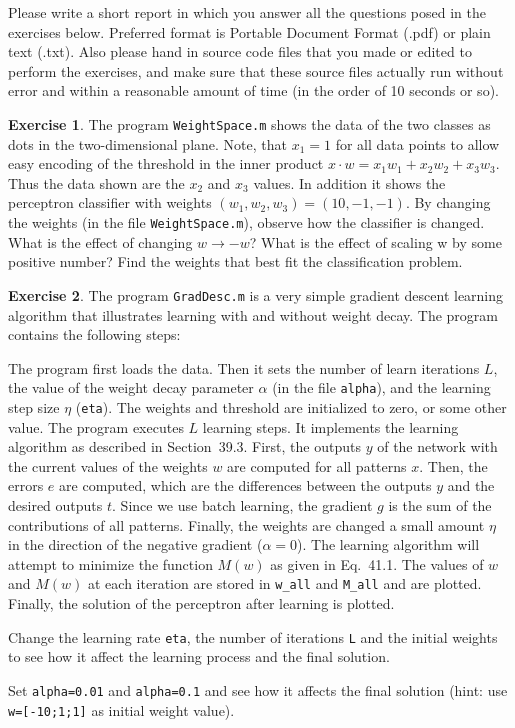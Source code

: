 \documentclass[a4paper]{article}
\theoremstyle{definition}
\newtheorem{ex}{Exercise}
\begin{document}
Please write a short report in which you answer all the questions posed in the exercises below. Preferred format is Portable Document Format (.pdf) or plain text (.txt). Also please hand in source code files that you made or edited to perform the exercises, and make sure that these source files actually run without error and within a reasonable amount of time (in the order of 10 seconds or so). 

\begin{ex}

The program \texttt{WeightSpace.m} shows the data of the two classes as dots in the two-dimensional plane. Note, that $x_1=1$ for all data points to allow easy encoding of the threshold in the inner product $x\cdot w = x_1w_1+x_2w_2+x_3w_3$. Thus the data shown are the $x_2$ and $x_3$ values. In addition it shows the perceptron classifier with weights $(w_1,w_2,w_3)=(10, -1, -1)$. By changing the weights (in the file \texttt{WeightSpace.m}), observe how the classifier is changed. What is the effect of changing $w \rightarrow -w$? What is the effect of scaling w by some positive number? Find the weights that best fit the classification problem. 

\end{ex}
\begin{ex}


The program \texttt{GradDesc.m} is a very simple gradient descent learning
algorithm that illustrates learning with and without weight decay. The
program contains the following steps:

The program first loads the data. Then it sets the number of learn iterations $L$, the value of the weight decay parameter $\alpha$ (in the file \texttt{alpha}), and the learning step size $\eta$ (\texttt{eta}). The weights and threshold are initialized to zero, or some other value. The program executes $L$ learning steps. It implements the learning algorithm as described in Section~39.3. First, the outputs $y$ of the network with the current values of the weights $w$ are computed for all patterns $x$. Then, the errors $e$ are computed, which are the differences between the outputs $y$ and the desired outputs $t$. Since we use batch learning, the gradient $g$ is the sum of the contributions of all patterns. Finally, the weights are changed a small amount $\eta$ in the direction of the negative gradient ($\alpha=0$). The learning algorithm will attempt to minimize the function $M(w)$ as given in Eq.~41.1. The values of $w$ and $M(w)$ at each iteration are stored in \texttt{w\_all} and
\texttt{M\_all} and are plotted. Finally, the solution of the perceptron after learning is plotted.

Change the learning rate \texttt{eta}, the number of iterations \texttt{L} and the initial weights to see how it affect the learning process and the final solution.

Set \texttt{alpha=0.01} and \texttt{alpha=0.1} and see how it affects the final solution (hint: use \texttt{w=[-10;1;1]} as initial weight value). \\

\end{ex}
\end{document}
